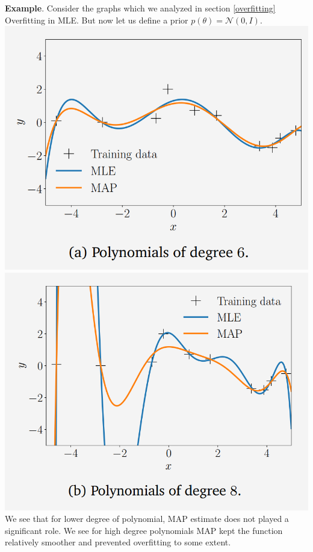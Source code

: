 \documentclass[12pt]{article}
\numberwithin{equation}{section}
\begin{document}
{\noindent
\textbf{Example}. Consider the graphs which we analyzed in section \ref{overfitting} Overfitting in MLE. But now let us define a prior $p(\theta) = \mathcal{N}(0, I)$.\\
\includegraphics[scale=0.48]{garph13} \includegraphics[scale=0.48]{graph14} \\
We see that for lower degree of polynomial, MAP estimate does not played a significant role. We see for high degree polynomials MAP kept the function relatively smoother and prevented overfitting to some extent.


}
\end{document}
